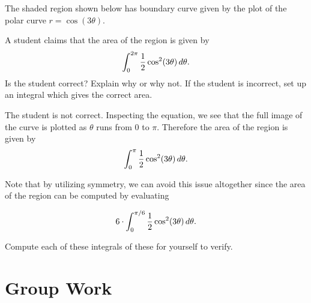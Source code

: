 \documentclass[noauthor]{ximera}
\begin{document}
\begin{problem}
The shaded region shown below has boundary curve given by the plot of the polar curve $r = \cos(3\theta)$. 

\begin{image}  
\end{image} 

A student claims that the area of the region is given by 
$$
\int_0^{2\pi} \frac{1}{2} \cos^2(3\theta) \mathop{}\!d \theta.
$$
Is the student correct? Explain why or why not. If the student is incorrect, set up an integral which gives the correct area.

\begin{freeResponse}
The student is not correct. Inspecting the equation, we see that the full image of the curve is plotted as $\theta$ runs from $0$ to $\pi$. Therefore the area of the region is given by 
$$
\int_0^{\pi} \frac{1}{2} \cos^2(3\theta) \mathop{}\!d \theta.
$$

Note that by utilizing symmetry, we can avoid this issue altogether since the area of the region can be computed by evaluating

$$
6 \cdot \int_0^{\pi/6} \frac{1}{2} \cos^2(3\theta) \mathop{}\!d \theta.
$$

Compute each of these integrals of these for yourself to verify.
\end{freeResponse}
\end{problem}

\section{Group Work}
\end{document}
